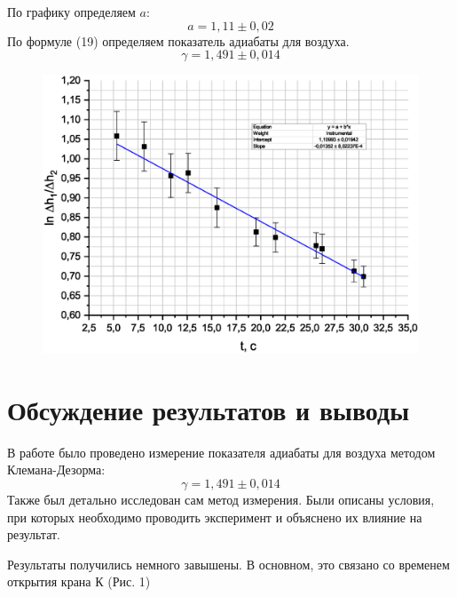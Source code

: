 \documentclass[a4paper,12pt]{article}
\theoremstyle{plain} %
\theoremstyle{definition} %
\theoremstyle{remark} %
\begin{document}
\noindent По графику определяем $a$:
\[a = 1,11\pm0,02\]
По формуле (19) определяем показатель адиабаты для воздуха.
\[\gamma = 1,491\pm0,014\]
\begin{figure}[H]
	\begin{center}
		\includegraphics[width=\linewidth]{3}
	\end{center}
\end{figure}
\section{Обсуждение результатов и выводы}
В работе было проведено измерение показателя адиабаты для воздуха методом Клемана-Дезорма:
\[\gamma = 1,491\pm0,014\]
Также был детально исследован сам метод измерения. Были описаны условия, при которых необходимо проводить эксперимент и объяснено их влияние на результат.

Результаты получились немного завышены. В основном, это связано со временем открытия крана $\text{К}$ (Рис. 1)
\end{document}
